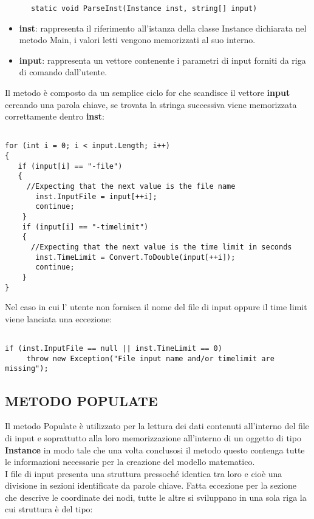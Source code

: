 \documentclass[11pt]{article}
\begin{document}
\begin{lstlisting}
      static void ParseInst(Instance inst, string[] input) 
\end{lstlisting}


\begin{itemize}
\item \textbf{inst}: rappresenta il riferimento all'istanza della classe Instance dichiarata nel metodo Main, i valori letti vengono memorizzati al suo interno.
\item \textbf{input}: rappresenta un vettore contenente i parametri di input forniti da riga di comando dall'utente.
\end{itemize}


Il metodo è composto da un semplice ciclo for che scandisce il vettore \textbf{input} cercando una parola chiave, se trovata la stringa successiva viene memorizzata correttamente dentro \textbf{inst}: 

\begin{lstlisting}

for (int i = 0; i < input.Length; i++)
{
   if (input[i] == "-file")
   {
     //Expecting that the next value is the file name
       inst.InputFile = input[++i];
       continue;
    }
    if (input[i] == "-timelimit")
    {
      //Expecting that the next value is the time limit in seconds
       inst.TimeLimit = Convert.ToDouble(input[++i]);
       continue;
    }
}               
\end{lstlisting}

Nel caso in cui l' utente non fornisca il nome del file di input oppure il time limit viene lanciata una eccezione:

\begin{lstlisting}

if (inst.InputFile == null || inst.TimeLimit == 0)
     throw new Exception("File input name and/or timelimit are missing");

\end{lstlisting}

\subsection*{METODO POPULATE}

Il metodo Populate è utilizzato per la lettura dei dati contenuti all'interno del file di input e soprattutto alla loro memorizzazione all'interno di un oggetto di tipo \textbf{Instance} in modo tale che una volta conclusosi il metodo questo contenga tutte le informazioni necessarie per la creazione del modello matematico.\\
I file di input presenta una struttura pressoché identica tra loro e cioè una divisione in sezioni identificate da parole chiave. Fatta eccezione per la sezione che descrive le coordinate dei nodi, tutte le altre si sviluppano in una sola riga la cui struttura è del tipo:
\end{document}
